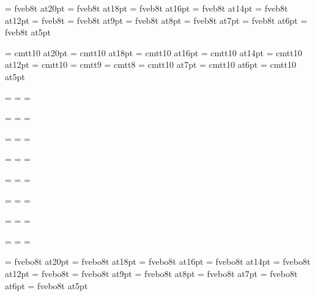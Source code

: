 \font\twentybf=     fveb8t at20pt
\font\eighteenbf=   fveb8t at18pt
\font\sixteenbf=    fveb8t at16pt
\font\fourteenbf=   fveb8t at14pt
\font\twelvebf=     fveb8t at12pt
\font\tenbf=        fveb8t
\font\ninebf=       fveb8t at9pt
\font\eightbf=      fveb8t at8pt
\font\sevenbf=      fveb8t at7pt
\font\sixbf=        fveb8t at6pt
\font\fivebf=       fveb8t at5pt

\font\twentytt=     cmtt10 at20pt
\font\eighteentt=   cmtt10 at18pt
\font\sixteentt=    cmtt10 at16pt
\font\fourteentt=   cmtt10 at14pt
\font\twelvett=     cmtt10 at12pt
\font\tentt=        cmtt10
\font\ninett=       cmtt9
\font\eighttt=      cmtt8
\font\seventt=      cmtt10 at7pt
\font\sixtt=        cmtt10 at6pt
\font\fivett=       cmtt10 at5pt




=\tenrm
{}=\sevenrm
{}=\fiverm
\def\rm{\fam=0 \tenrm}

=\twelvei
{}=\eighti
{}=\sixi
\def\mit{\fam=1}

=\twelvesy
{}=\eightsy
{}=\sixsy
\def\cal{\fam=2}

=\twelveex
{}=\eightex
{}=\sixex


\def\it{\fam=\itfam \tenit}
\textfont\itfam=\tenit
\scriptfont\itfam=\sevenit
\scriptscriptfont\itfam=\fiveit

\def\sl{\fam=\slfam \tensl}
\textfont\slfam=\tensl
\scriptfont\slfam=\sevensl
\scriptscriptfont\slfam=\fivesl

\def\bf{\fam=\bffam \tenbf}
\textfont\bffam=\tenbf
\scriptfont\bffam=\sevenbf
\scriptscriptfont\bffam=\fivebf

\def\tt{\fam=\ttfam \tentt}
\textfont\ttfam=\tentt
\scriptfont\ttfam=\seventt
\scriptscriptfont\ttfam=\fivett

\font\twentyitbf=      fvebo8t at20pt
\font\eighteenitbf=    fvebo8t at18pt
\font\sixteenitbf=     fvebo8t at16pt
\font\fourteenitbf=    fvebo8t at14pt
\font\twelveitbf=      fvebo8t at12pt
\font\itbf=            fvebo8t
\font\nineitbf=        fvebo8t at9pt
\font\eightitbf=       fvebo8t at8pt
\font\sevenitbf=       fvebo8t at7pt
\font\sixitbf=         fvebo8t at6pt
\font\fiveitbf=        fvebo8t at5pt

